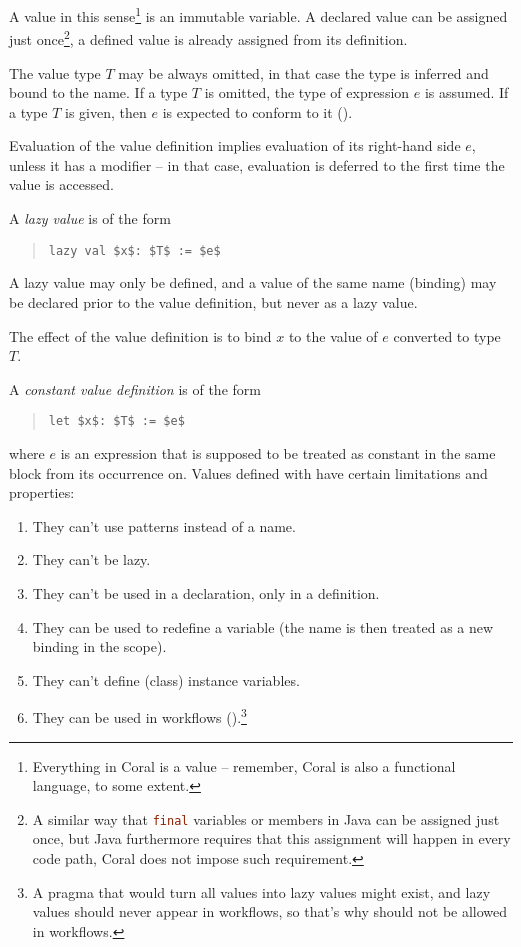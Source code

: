A value in this sense\footnote{Everything in Coral is a value -- remember, Coral is also a functional language, to some extent.} is an immutable variable. A declared value can be assigned just once\footnote{A similar way that \lstinline[language=Java]@final@ variables or members in Java can be assigned just once, but Java furthermore requires that this assignment will happen in every code path, Coral does not impose such requirement.}, a defined value is already assigned from its definition. 

The value type $T$ may be always omitted, in that case the type is inferred and bound to the name. If a type $T$ is omitted, the type of expression $e$ is assumed. If a type $T$ is given, then $e$ is expected to conform to it (). 

Evaluation of the value definition implies evaluation of its right-hand side $e$, unless it has a modifier  -- in that case, evaluation is deferred to the first time the value is accessed. 

A {\em lazy value} is of the form
\begin{quote}\begin{lstlisting}
lazy val $x$: $T$ := $e$
\end{lstlisting}\end{quote}

A lazy value may only be defined, and a value of the same name (binding) may be declared prior to the value definition, but never as a lazy value. 

The effect of the value definition is to bind $x$ to the value of $e$ converted to type $T$. 

A {\em constant value definition} is of the form 
\begin{quote}\begin{lstlisting}
let $x$: $T$ := $e$
\end{lstlisting}\end{quote}
where $e$ is an expression that is supposed to be treated as constant in the same block from its occurrence on. Values defined with  have certain limitations and properties:

\begin{enumerate}
\item They can't use patterns instead of a name. 
\item They can't be lazy. 
\item They can't be used in a declaration, only in a definition. 
\item They can be used to redefine a variable (the name is then treated as a new binding in the scope). 
\item They can't define (class) instance variables. 
\item They can be used in workflows ().\footnote{A pragma that would turn all values into lazy values might exist, and lazy values should never appear in workflows, so that's why  should not be allowed in workflows.}
\end{enumerate}

